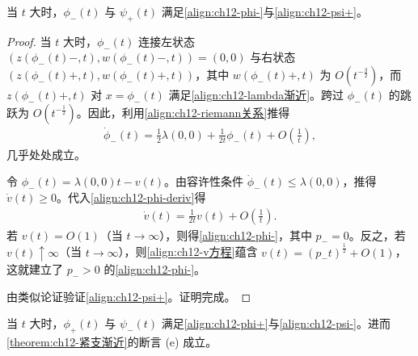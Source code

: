 \documentclass[../../main.tex]{subfiles}
\begin{document}
\begin{lemma}\label{lemma:ch12-phi-psi+}
当 $t$ 大时，$\phi_-(t)$ 与 $\psi_+(t)$ 满足\eqref{align:ch12-phi-}与\eqref{align:ch12-psi+}。
\end{lemma}

\begin{proof}
当 $t$ 大时，$\phi_-(t)$ 连接左状态 $(z(\phi_-(t)-,t),w(\phi_-(t)-,t))=(0,0)$ 与右状态 $(z(\phi_-(t)+,t),w(\phi_-(t)+,t))$，其中 $w(\phi_-(t)+,t)$ 为 $O(t^{-\frac32})$，而 $z(\phi_-(t)+,t)$ 对 $x=\phi_-(t)$ 满足\eqref{align:ch12-lambda渐近}。跨过 $\phi_-(t)$ 的跳跃为 $O(t^{-\frac12})$。因此，利用\eqref{align:ch12-riemann关系}推得
\begin{align}
\dot\phi_-(t)=\frac12\lambda(0,0)+\frac{1}{2t}\phi_-(t)+O\left(\frac1t\right),
\label{align:ch12-phi-deriv}
\end{align}
几乎处处成立。

令 $\phi_-(t)=\lambda(0,0)t-v(t)$。由容许性条件 $\dot\phi_-(t)\leqslant\lambda(0,0)$，推得 $\dot v(t)\geqslant0$。代入\eqref{align:ch12-phi-deriv}得
\begin{align}
\dot v(t)=\frac{1}{2t}v(t)+O\left(\frac1t\right).
\label{align:ch12-v方程}
\end{align}
若 $v(t)=O(1)$（当 $t\to\infty$），则得\eqref{align:ch12-phi-}，其中 $p_-=0$。反之，若 $v(t)\uparrow\infty$（当 $t\to\infty$），则\eqref{align:ch12-v方程}蕴含 $v(t)=(p_-t)^{\frac12}+O(1)$，这就建立了 $p_->0$ 的\eqref{align:ch12-phi-}。

由类似论证验证\eqref{align:ch12-psi+}。证明完成。
\end{proof}

\begin{lemma}\label{lemma:ch12-phi+psi-}
当 $t$ 大时，$\phi_+(t)$ 与 $\psi_-(t)$ 满足\eqref{align:ch12-phi+}与\eqref{align:ch12-psi-}。进而\cref{theorem:ch12-紧支渐近}的断言 (e) 成立。
\end{lemma}
\end{document}
